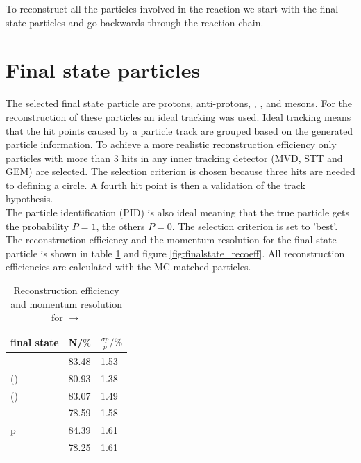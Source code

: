 To reconstruct all the particles involved in the reaction we start with the final state particles and go backwards through the reaction chain.

\section{Final state particles}
	The selected final state particle are protons, anti-protons, \piminus, \piplus, \kminus and \kplus mesons.
	For the reconstruction of these particles an ideal tracking was used.
	Ideal tracking means that the hit points caused by a particle track are grouped based on the generated particle information. 
	To achieve a more realistic reconstruction efficiency only particles with more than 3 hits in any inner tracking detector (MVD, STT and GEM)
	are selected.
	The selection criterion is chosen because three hits are needed to defining a circle.
	A fourth hit point is then a validation of the track hypothesis.\\
	The particle identification (PID) is also ideal meaning that the true particle gets the probability $P=1$, the others $P=0$. 
	The selection criterion is set to 'best'.\vspace{11pt} \\
	The reconstruction efficiency and the momentum resolution for the final state particle is shown in table \ref{tab:finalstate_recoeff} and figure \ref{fig:finalstate_recoeff}.
	All reconstruction efficiencies are calculated with the MC matched particles.
	
	\begin{table}
		\centering
		\caption{\propose Reconstruction efficiency and momentum resolution for \pbarpSystem $\rightarrow$ \excitedcascade \anticascade}
		\label{tab:finalstate_recoeff}
		\begin{tabular}{lll}
			\hline
			final state & N/$\%$ & $\frac{\sigma p}{p}/\%$ \\
			\hline
			\hline
			\piminus & 83.48 & 1.53\\
			\piplusone(\anticascade) &  80.93& 1.38 \\
			\piplustwo(\alam) &  83.07& 1.49\\
			\kminus&  78.59& 1.58\\
			p &  84.39& 1.61\\
			\antiproton & 78.25 & 1.61\\\hline
			 
		\end{tabular}
	\end{table}
	
